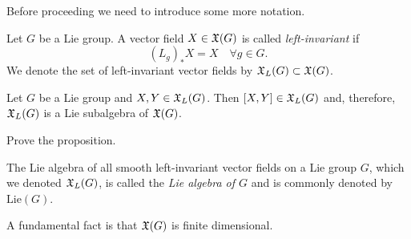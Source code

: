 Before proceeding we need to introduce some more notation.

\begin{definition}
  Let $G$ be a Lie group.
  A vector field $X\in\mathfrak{X}(G)$ is called \emph{left-invariant} if
  \begin{equation}
    (L_g)_*X = X \quad \forall g\in G.
  \end{equation}
  We denote the set of left-invariant vector fields by $\mathfrak{X}_L(G)\subset \mathfrak{X}(G)$.
\end{definition}



\begin{proposition}
  Let $G$ be a Lie group and $X,Y\in\mathfrak{X}_L(G)$.
  Then $[X,Y]\in\mathfrak{X}_L(G)$ and, therefore, $\mathfrak{X}_L(G)$ is a Lie subalgebra of $\mathfrak{X}(G)$.
\end{proposition}
\begin{exercise}
  Prove the proposition.
\end{exercise}

\begin{remark}
  The Lie algebra of all smooth left-invariant vector fields on a Lie group $G$, which we denoted $\mathfrak{X}_L(G)$, is called the \emph{Lie algebra of $G$} and is commonly denoted by $\mathrm{Lie}(G)$.
\end{remark}

A fundamental fact is that $\mathfrak{X}(G)$ is finite dimensional.

